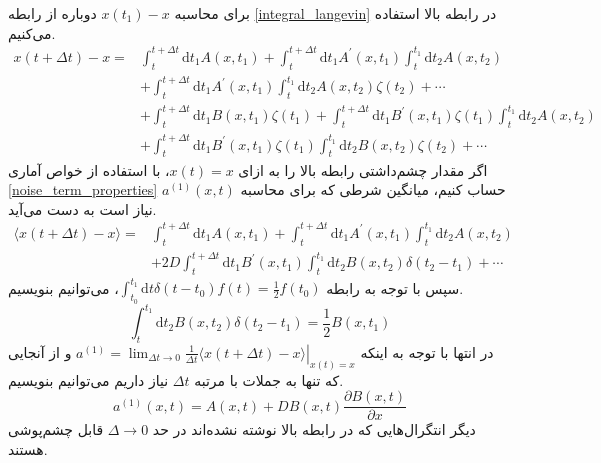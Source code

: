 برای محاسبه $x(t_{1}) - x$  دوباره از رابطه \ref{integral_langevin} در رابطه بالا استفاده می‌کنیم.
$$
\begin{aligned} x(t+\Delta t)-x=& \int_{t}^{t+\Delta t} \mathrm{d} t_{1} A\left(x, t_{1}\right) +\int_{t}^{t+\Delta t} \mathrm{d} t_{1} A^{\prime}\left(x, t_{1}\right) \int_{t}^{t_{1}} \mathrm{d} t_{2} A\left(x, t_{2}\right) \\ &+\int_{t}^{t+\Delta t} \mathrm{d} t_{1} A^{\prime}\left(x, t_{1}\right) \int_{t}^{t_{1}} \mathrm{d} t_{2} A\left(x, t_{2}\right) \zeta\left(t_{2}\right)+\cdots \\ &+\int_{t}^{t+\Delta t} \mathrm{d} t_{1} B\left(x, t_{1}\right) \zeta\left(t_{1}\right) +\int_{t}^{t+\Delta t} \mathrm{d} t_{1} B^{\prime}\left(x, t_{1}\right) \zeta\left(t_{1}\right) \int_{t}^{t_{1}} \mathrm{d} t_{2} A\left(x, t_{2}\right) \\ &+\int_{t}^{t+\Delta t} \mathrm{d} t_{1} B^{\prime}\left(x, t_{1}\right) \zeta\left(t_{1}\right) \int_{t}^{t_{1}} \mathrm{d} t_{2} B\left(x, t_{2}\right) \zeta\left(t_{2}\right)+\cdots \end{aligned}
$$
اگر مقدار چشم‌داشتی رابطه بالا را به ازای $x(t) = x$، با استفاده از خواص آماری \ref{noise_term_properties} حساب کنیم، میانگین شرطی که برای محاسبه $a^{(1)}(x,t)$ نیاز است به دست می‌آید.
$$
\begin{aligned}\langle x(t+\Delta t)-x\rangle=& \int_{t}^{t+\Delta t} \mathrm{d} t_{1} A\left(x, t_{1}\right)+\int_{t}^{t+\Delta t} \mathrm{d} t_{1} A^{\prime}\left(x, t_{1}\right) \int_{t}^{t_{1}} \mathrm{d} t_{2} A\left(x, t_{2}\right) \\ &+2 D \int_{t}^{t+\Delta t} \mathrm{d} t_{1} B^{\prime}\left(x, t_{1}\right) \int_{t}^{t_{1}} \mathrm{d} t_{2} B\left(x, t_{2}\right) \delta\left(t_{2}-t_{1}\right)+\cdots \end{aligned}
$$
سپس با توجه به رابطه $\int_{t_{0}}^{t_{1}} \mathrm{d} t \delta\left(t-t_{0}\right) f(t)=\frac{1}{2} f\left(t_{0}\right)$، می‌توانیم بنویسیم.
\begin{equation}
  \int_{t}^{t_{1}} \mathrm{d} t_{2} B\left(x, t_{2}\right) \delta\left(t_{2}-t_{1}\right)=\frac{1}{2} B\left(x, t_{1}\right)
\end{equation}
در انتها با توجه به اینکه $a^{(1)}=\left.\lim _{\Delta t \rightarrow 0} \frac{1}{\Delta t}\langle x(t+\Delta t)-x\rangle\right|_{x(t)=x}$ و از آنجایی که تنها به  جملات با مرتبه $\Delta t$ نیاز داریم می‌توانیم بنویسیم.
$$
a^{(1)}(x, t)=A(x, t)+D B(x, t) \frac{\partial B(x, t)}{\partial x}
$$
دیگر انتگرال‌هایی که در رابطه بالا نوشته نشده‌اند در حد $\Delta \rightarrow 0$ قابل چشم‌پوشی هستند.

